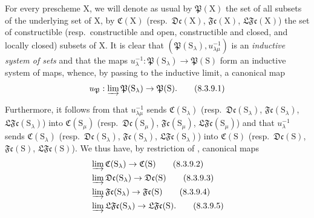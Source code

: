 \begin{env}[8.3.9]
\label{IV.8.3.9}
For every prescheme $\mathrm{X}$, we will denote as usual by $\mathfrak{P}(\mathrm{X})$ the set of all subsets of the underlying set of $\mathrm{X}$, by $\mathfrak{C}(\mathrm{X})$ (resp.\ $\mathfrak{Dc}(\mathrm{X})$, $\mathfrak{Fc}(\mathrm{X})$, $\mathfrak{LFc}(\mathrm{X})$) the set of constructible (resp.\ constructible and open, constructible and closed, and locally closed) subsets of $\mathrm{X}$.
It is clear that $(\mathfrak{P}(\mathrm{S}_\lambda),u_{\lambda\mu}^{-1})$ is an \emph{inductive system of sets} and that the maps $u_\lambda^{-1}:\mathfrak{P}(\mathrm{S}_\lambda)\to\mathfrak{P}(\mathrm{S})$ form an inductive system of maps, whence, by passing to the inductive limit, a canonical map
\begin{equation}
  u_\mathfrak{P}:\varinjlim\mathfrak{P}(\mathrm{S}_\lambda)\to\mathfrak{P}(\mathrm{S}).
  \tag{8.3.9.1}
\label{IV.8.3.9.1}
\end{equation}

Furthermore, it follows from  that $u_{\lambda\mu}^{-1}$ sends $\mathfrak{C}(\mathrm{S}_\lambda)$ (resp.\ $\mathfrak{Dc}(\mathrm{S}_\lambda)$, $\mathfrak{Fc}(\mathrm{S}_\lambda)$, $\mathfrak{LFc}(\mathrm{S}_\lambda)$) into $\mathfrak{C}(\mathrm{S}_\mu)$ (resp.\ $\mathfrak{Dc}(\mathrm{S}_\mu)$, $\mathfrak{Fc}(\mathrm{S}_\mu)$, $\mathfrak{LFc}(\mathrm{S}_\mu)$) and that $u_\lambda^{-1}$ sends $\mathfrak{C}(\mathrm{S}_\lambda)$ (resp.\ $\mathfrak{Dc}(\mathrm{S}_\lambda)$, $\mathfrak{Fc}(\mathrm{S}_\lambda)$, $\mathfrak{LFc}(\mathrm{S}_\lambda)$) into $\mathfrak{C}(\mathrm{S})$ (resp.\ $\mathfrak{Dc}(\mathrm{S})$, $\mathfrak{Fc}(\mathrm{S})$, $\mathfrak{LFc}(\mathrm{S})$).
We thus have, by restriction of , canonical maps
\begin{align}
  &\varinjlim\mathfrak{C}(\mathrm{S}_\lambda)\to\mathfrak{C}(\mathrm{S}) \tag{8.3.9.2}\label{IV.8.3.9.2}\\
  &\varinjlim\mathfrak{Dc}(\mathrm{S}_\lambda)\to\mathfrak{Dc}(\mathrm{S}) \tag{8.3.9.3}\label{IV.8.3.9.3}\\
  &\varinjlim\mathfrak{Fc}(\mathrm{S}_\lambda)\to\mathfrak{Fc}(\mathrm{S}) \tag{8.3.9.4}\label{IV.8.3.9.4}\\
  &\varinjlim\mathfrak{LFc}(\mathrm{S}_\lambda)\to\mathfrak{LFc}(\mathrm{S}). \tag{8.3.9.5}
\label{IV.8.3.9.5}
\end{align}
\end{env}

